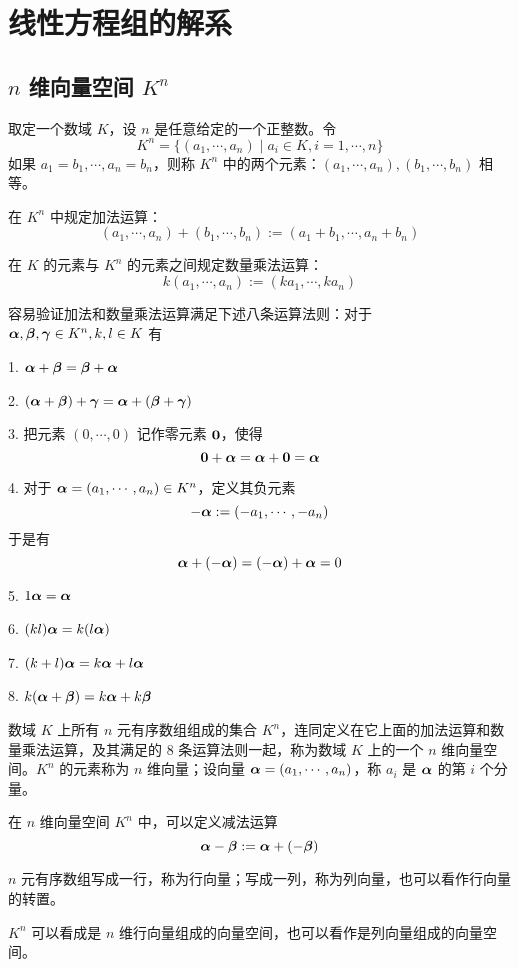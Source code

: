 \chapter{线性方程组的解系}

\section{\texorpdfstring{$n$ 维向量空间 $K^n$}{n 维向量空间 Kn}}

取定一个数域 $K$，设 $n$ 是任意给定的一个正整数。令
$$K^n=\{(a_1,\cdots,a_n) \mid a_i\in K,i=1,\cdots,n\}$$
如果 $a_1=b_1,\cdots,a_n=b_n$，则称 $K^n$ 中的两个元素：$(a_1,\cdots,a_n),(b_1,\cdots,b_n)$ 相等。

在 $K^n$ 中规定加法运算：
$$(a_1,\cdots,a_n)+(b_1,\cdots,b_n):=(a_1+b_1,\cdots,a_n+b_n)$$

在 $K$ 的元素与 $K^n$ 的元素之间规定数量乘法运算：
$$k(a_1,\cdots,a_n) := (ka_1,\cdots,ka_n)$$

容易验证加法和数量乘法运算满足下述八条运算法则：对于 $\boldsymbol{\alpha},\boldsymbol{\beta},\boldsymbol{\gamma}\in K^n,k,l\in K$ 有

1. $\boldsymbol{\alpha}+\boldsymbol{\beta}=\boldsymbol{\beta}+\boldsymbol{\alpha}$

2. $(\boldsymbol{\alpha}+\boldsymbol{\beta})+\boldsymbol{\gamma}=\boldsymbol{\alpha}+(\boldsymbol{\beta}+\boldsymbol{\gamma})$

3. 把元素 $(0,\cdots,0)$ 记作零元素 $\boldsymbol{0}$，使得
$$\boldsymbol{0} + \boldsymbol{\alpha} = \boldsymbol{\alpha} + \boldsymbol{0} = \boldsymbol{\alpha}$$

4. 对于 $\boldsymbol{\alpha} = (a_1,\cdots,a_n)\in K^n$，定义其负元素
$$-\boldsymbol{\alpha} := (-a_1,\cdots,-a_n)$$
于是有
$$\boldsymbol{\alpha} + (-\boldsymbol{\alpha}) = (-\boldsymbol{\alpha})+\boldsymbol{\alpha} = 0$$

5. $1\boldsymbol{\alpha} = \boldsymbol{\alpha}$

6. $(kl)\boldsymbol{\alpha} = k(l\boldsymbol{\alpha})$

7. $(k+l)\boldsymbol{\alpha} = k\boldsymbol{\alpha} + l\boldsymbol{\alpha}$

8. $k (\boldsymbol{\alpha}+\boldsymbol{\beta}) = k\boldsymbol{\alpha} + k\boldsymbol{\beta}$

\begin{definition}[$n$ 维向量空间]
	数域 $K$ 上所有 $n$ 元有序数组组成的集合 $K^n$，连同定义在它上面的加法运算和数量乘法运算，及其满足的 8 条运算法则一起，称为数域 $K$ 上的一个 $n$ 维向量空间。$K^n$ 的元素称为 $n$ 维向量；设向量 $\boldsymbol{\alpha}  = (a_1,\cdots,a_n)$，称 $a_i$ 是 $\boldsymbol{\alpha}$ 的第 $i$ 个分量。
\end{definition}

在 $n$ 维向量空间 $K^n$ 中，可以定义减法运算
$$\boldsymbol{\alpha} - \boldsymbol{\beta} := \boldsymbol{\alpha} + (-\boldsymbol{\beta})$$

$n$ 元有序数组写成一行，称为行向量；写成一列，称为列向量，也可以看作行向量的转置。

$K^n$ 可以看成是 $n$ 维行向量组成的向量空间，也可以看作是列向量组成的向量空间。

